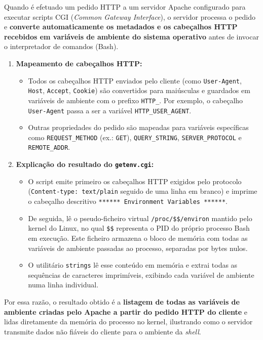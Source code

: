 \documentclass[11pt,a4paper]{article}
\begin{document}
Quando é efetuado um pedido HTTP a um servidor Apache configurado para executar scripts CGI
(\textit{Common Gateway Interface}), o servidor processa o pedido e \textbf{converte
automaticamente os metadados e os cabeçalhos HTTP recebidos em variáveis de ambiente do
sistema operativo} antes de invocar o interpretador de comandos (Bash).

\begin{enumerate}
\item \textbf{Mapeamento de cabeçalhos HTTP:}
\begin{itemize}
\item Todos os cabeçalhos HTTP enviados pelo cliente (como \texttt{User-Agent},
\texttt{Host}, \texttt{Accept}, \texttt{Cookie}) são convertidos para maiúsculas e
guardados em variáveis de ambiente com o prefixo \texttt{HTTP\_}. Por exemplo, o cabeçalho
\texttt{User-Agent} passa a ser a variável \texttt{HTTP\_USER\_AGENT}.
\item Outras propriedades do pedido são mapeadas para variáveis específicas como
\texttt{REQUEST\_METHOD} (ex.: \texttt{GET}), \texttt{QUERY\_STRING},
\texttt{SERVER\_PROTOCOL} e \texttt{REMOTE\_ADDR}.
\end{itemize}

\item \textbf{Explicação do resultado do \texttt{getenv.cgi}:}
\begin{itemize}
\item O script emite primeiro os cabeçalhos HTTP exigidos pelo protocolo
(\texttt{Content-type: text/plain} seguido de uma linha em branco) e imprime o cabeçalho
descritivo \texttt{****** Environment Variables ******}.
\item De seguida, lê o pseudo-ficheiro virtual \texttt{/proc/\$\$/environ} mantido pelo
kernel do Linux, no qual \texttt{\$\$} representa o PID do próprio processo Bash em execução.
Este ficheiro armazena o bloco de memória com todas as variáveis de ambiente passadas ao
processo, separadas por bytes nulos.
\item O utilitário \texttt{strings} lê esse conteúdo em memória e extrai todas as sequências
de caracteres imprimíveis, exibindo cada variável de ambiente numa linha individual.
\end{itemize}
\end{enumerate}

Por essa razão, o resultado obtido é a \textbf{listagem de todas as variáveis de ambiente
criadas pelo Apache a partir do pedido HTTP do cliente} e lidas diretamente da memória do
processo no kernel, ilustrando como o servidor transmite dados não fiáveis do cliente para
o ambiente da \textit{shell}.
\end{document}
